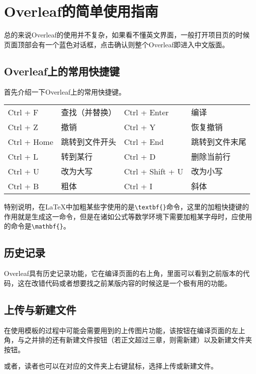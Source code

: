 \section{Overleaf的简单使用指南}

总的来说Overleaf的使用并不复杂，如果看不懂英文界面，一般打开项目页的时候页面顶部会有一个蓝色对话框，点击确认则整个Overleaf即进入中文版面。

\subsection{Overleaf上的常用快捷键}

首先介绍一下Overleaf上的常用快捷键。

\begin{table}[ht]\centering
\begin{tabular}{l l l l}
\hline
Ctrl + F & 查找（并替换）& Ctrl + Enter & 编译 \\
Ctrl + Z & 撤销 & Ctrl + Y & 恢复撤销 \\
Ctrl + Home & 跳转到文件开头 & Ctrl + End & 跳转到文件末尾 \\
Ctrl + L & 转到某行 & Ctrl + D & 删除当前行 \\
Ctrl + U & 改为大写 & Ctrl + Shift + U & 改为小写 \\
Ctrl + B & 粗体 & Ctrl + I & 斜体 \\
\hline
\end{tabular}
\end{table}
特别说明，在LaTeX中加粗某些字使用的是\verb|\textbf{}|命令，这里的加粗快捷键的作用就是生成这一命令，但是在诸如公式等数学环境下需要加粗某字母时，应使用的命令是\verb|\mathbf{}|。

\subsection{历史记录}

Overleaf具有历史记录功能，它在编译页面的右上角，里面可以看到之前版本的代码，这在改错代码或者想要找之前某版内容的时候这是一个极有用的功能。

\subsection{上传与新建文件}

在使用模板的过程中可能会需要用到的上传图片功能，该按钮在编译页面的左上角，与之并排的还有新建文件按钮（若正文超过三章，则需新建）以及新建文件夹按钮。

或者，读者也可以在对应的文件夹上右键鼠标，选择上传或新建文件。

